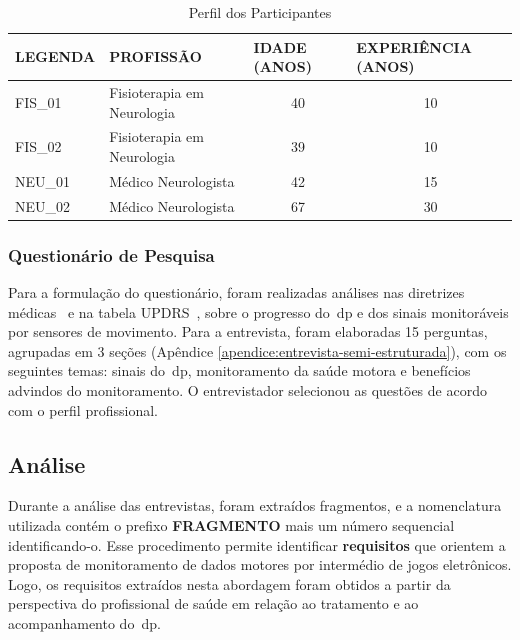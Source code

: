 \begin{table}[h]
\caption{Perfil dos Participantes}
\label{table:perfil_analise_participantes}
\begin{tabular}{|l|l|c|c|}
\hline
\textbf{LEGENDA} & \textbf{PROFISSÃO}             & \multicolumn{1}{|l}{\textbf{IDADE (ANOS)}} & \multicolumn{1}{|l|}{\textbf{EXPERIÊNCIA (ANOS)}} \\ \hline
FIS\_01          & Fisioterapia em Neurologia & 40                                         & 10                                                \\ \hline
FIS\_02          & Fisioterapia em Neurologia     & 39                                         & 10                                                \\ \hline
NEU\_01          & Médico Neurologista            & 42                                         & 15                                                \\ \hline
NEU\_02          & Médico Neurologista            & 67                                         & 30                                                \\ \hline
\end{tabular}

\end{table}

\subsubsection{Questionário de Pesquisa}
Para a formulação do questionário, foram realizadas análises nas diretrizes médicas~\cite{protpar010,national2006parkinson} e na tabela UPDRS~\cite{updrs87}, sobre o progresso do~\ac{dp} e dos sinais monitoráveis por sensores de movimento. Para a entrevista, foram elaboradas 15 perguntas, agrupadas em 3 seções (Apêndice \ref{apendice:entrevista-semi-estruturada}), com os seguintes temas: sinais do~\ac{dp}, monitoramento da saúde motora e benefícios advindos do monitoramento. O entrevistador selecionou as questões de acordo com o perfil profissional.

\subsection{Análise}
Durante a análise das entrevistas, foram extraídos fragmentos, e a nomenclatura utilizada contém o prefixo \textbf{FRAGMENTO} mais um número sequencial identificando-o. Esse procedimento permite identificar \textbf{requisitos} que orientem a proposta de monitoramento de dados motores por intermédio de jogos eletrônicos. Logo, os requisitos extraídos nesta abordagem foram obtidos a partir da perspectiva do profissional de saúde em relação ao tratamento e ao acompanhamento do~\ac{dp}. 

